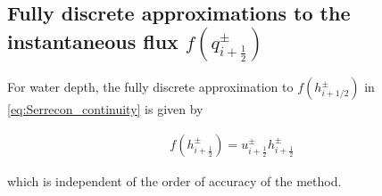 \documentclass[SingleSpace,12pt,Proceedings]{Serre_ASCE}
\begin{document}
\subsection{Fully discrete approximations to the instantaneous flux $f(q^{\pm}_{i + \frac{1}{2}})$} %
For water depth, the fully discrete approximation to $f(h^\pm_{i + 1/2})$ in \eqref{eq:Serrecon_continuity} is given by
\begin{linenomath*}
\begin{gather*} %
f\left(h^\pm_{i + \frac{1}{2}}\right) = u^\pm_{i + \frac{1}{2}} h^\pm_{i + \frac{1}{2}}
\end{gather*}
\end{linenomath*}
which is independent of the order of accuracy of the method. 
\end{document}
